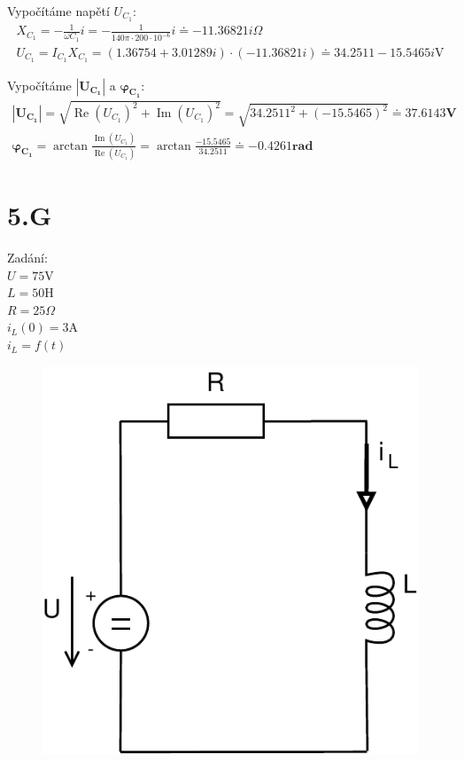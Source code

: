 \documentclass[12pt,a4paper]{article}
\begin{document}
	Vypočítáme napětí $U_{C_1}$:
	\begin{gather*}
		X_{C_1} = -\frac{1}{\omega C_1} i = -\frac{1}{140 \pi \cdot 200 \cdot 10^{-6}} i \doteq -11.36821i \Omega \\
		U_{C_1} = I_{C_1} X_{C_1} = (1.36754 + 3.01289i) \cdot (-11.36821i) \doteq 34.2511 - 15.5465i \text{V}
	\end{gather*}

	Vypočítáme $\boldsymbol{|U_{C_1}|}$ a $\boldsymbol{\varphi_{C_1}}$:
	\begin{gather*}
		\boldsymbol{|U_{C_1}|} = \sqrt{\operatorname{Re}(U_{C_1})^2 + \operatorname{Im}(U_{C_1})^2} = 
		\sqrt{34.2511^2 + (-15.5465)^2} \doteq \boldsymbol{37.6143 \textbf{V}} \\
		\boldsymbol{\varphi_{C_1}} = \arctan\frac{\operatorname{Im}(U_{C_1})}{\operatorname{Re}(U_{C_1})} =
		\arctan\frac{-15.5465}{34.2511} \doteq \boldsymbol{-0.4261 \textbf{rad}}
	\end{gather*}

	\newpage


	\section*{5.G}

	{\Large Zadání:} \\
	$U = 75 \text{V}$ \\
	$L = 50 \text{H}$ \\
	$R = 25 \Omega$ \\
	$i_L(0) = 3 \text{A}$ \\

	$i_L = f(t)$

	\begin{figure}[H] 
		\vspace{-1.2cm}
		\center\includegraphics[width=0.4\linewidth]{obr/5_1}
	\end{figure}
\end{document}
